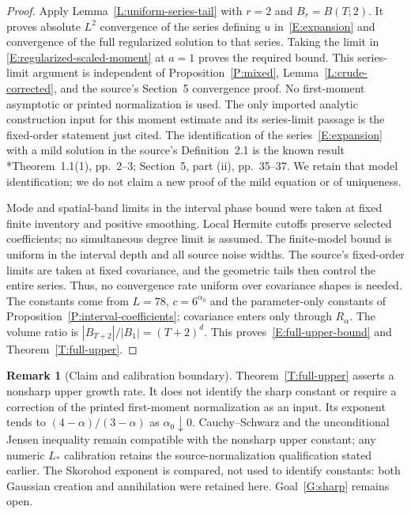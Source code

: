 \documentclass[12pt]{article}
\numberwithin{equation}{section}
\theoremstyle{definition}
\newtheorem{remark}[theorem]{Remark}
\begin{document}
\begin{proof}
  Apply Lemma~\ref{L:uniform-series-tail} with $r=2$ and
  $B_r=B(T;2)$. It proves absolute $L^2$ convergence of the series
  defining $u$ in~\eqref{E:expansion} and convergence of the full
  regularized solution to that series. Taking the limit in
  \eqref{E:regularized-scaled-moment} at $a=1$ proves the required bound.
  This series-limit argument is independent of
  Proposition~\ref{P:mixed}, Lemma~\ref{L:crude-corrected}, and the
  source's Section~5 convergence proof. No first-moment asymptotic or
  printed normalization is used. The only imported analytic construction
  input for this moment estimate and its series-limit passage is the
  fixed-order statement just cited.
  The identification of the series~\eqref{E:expansion} with a mild
  solution in the source's Definition~2.1 is the known result
  \cite{chen:author2026:time-dependency}*{Theorem~1.1(1), pp.~2--3;
  Section~5, part (ii), pp.~35--37}. We retain that model identification; we do not
  claim a new proof of the mild equation or of uniqueness.

  Mode and spatial-band limits in the interval phase bound were taken
  at fixed finite inventory and positive smoothing. Local Hermite cutoffs
  preserve selected coefficients; no simultaneous degree limit is assumed.
  The finite-model bound is uniform in the interval depth and all source
  noise widths. The source's fixed-order limits are taken at fixed
  covariance, and the geometric tails then control the entire series.
  Thus, no convergence rate uniform over covariance shapes is needed.
  The constants come from $L=78$, $c=6^{\alpha_0}$ and the parameter-only
  constants of Proposition~\ref{P:interval-coefficients}; covariance enters
  only through $R_\alpha$.
  The volume ratio is $|B_{T+2}|/|B_1|=(T+2)^d$.
  This proves~\eqref{E:full-upper-bound} and
  Theorem~\ref{T:full-upper}.
\end{proof}

\begin{remark}[Claim and calibration boundary]\label{R:full-upper-boundary}
  Theorem~\ref{T:full-upper} asserts a nonsharp upper growth rate.
  It does not identify the sharp constant or require a correction of the
  printed first-moment normalization as an input.
  Its exponent tends to $(4-\alpha)/(3-\alpha)$ as $\alpha_0\downarrow0$.
  Cauchy--Schwarz and the unconditional Jensen inequality remain compatible
  with the nonsharp upper constant; any numeric $L_*$ calibration retains
  the source-normalization qualification stated earlier.
  The Skorohod exponent is compared, not used to identify constants:
  both Gaussian creation and annihilation were retained here.
  Goal~\ref{G:sharp} remains open.
\end{remark}
\end{document}

